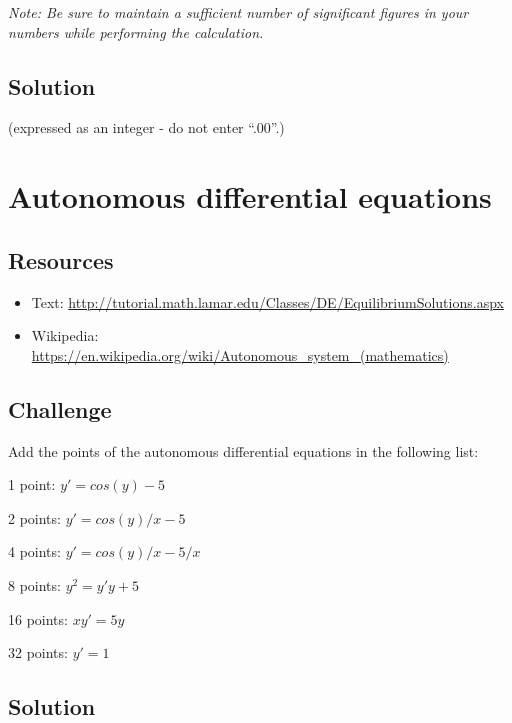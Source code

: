 \emph{Note: Be sure to maintain a sufficient number of significant figures in your numbers while performing the calculation.}

\subsection*{Solution}
 (expressed as an integer - do not enter ``.00''.)


\timebox



\newpage
\section{Autonomous differential equations}

\subsection*{Resources}
\begin{itemize}
    \item Text: \url{http://tutorial.math.lamar.edu/Classes/DE/EquilibriumSolutions.aspx}
    \item Wikipedia: \url{https://en.wikipedia.org/wiki/Autonomous_system_(mathematics)}
\end{itemize}

\subsection*{Challenge}
Add the points of the autonomous differential equations in the following list:

1 point: $y' = cos(y)-5$

2 points: $y' = cos(y)/x - 5$

4 points: $y' = cos(y)/x - 5/x$

8 points: $y^2 = y' y+5$

16 points: $x y' = 5 y$

32 points: $y' = 1$

\subsection*{Solution}
\six{}

\timebox




